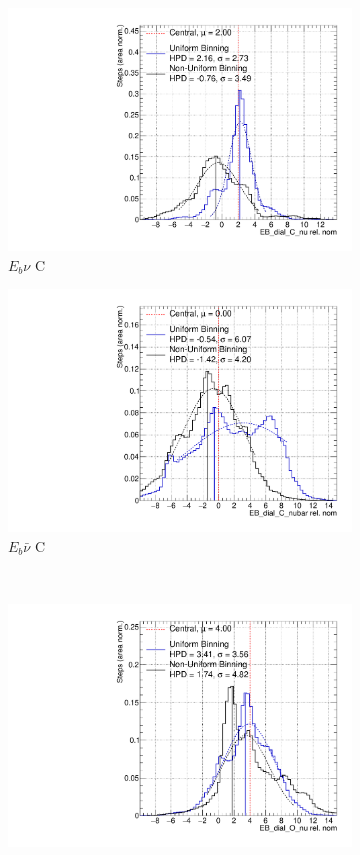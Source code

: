 \begin{figure}
\centering
\begin{subfigure}{.48\textwidth}
  \centering
  \includegraphics[width=0.73\linewidth]{figs/EB_dial_C_nuFluc2}
  \caption{$E_{b}\nu$ C}
\end{subfigure}
\begin{subfigure}{.48\textwidth}
  \centering
  \includegraphics[width=0.73\linewidth]{figs/EB_dial_C_nubarFluc2}
  \caption{$E_{b}\bar{\nu}$ C}
\end{subfigure} \\
\begin{subfigure}{.48\textwidth}
  \centering
  \includegraphics[width=0.73\linewidth]{figs/EB_dial_O_nuFluc2}

\end{subfigure}
\end{figure}
